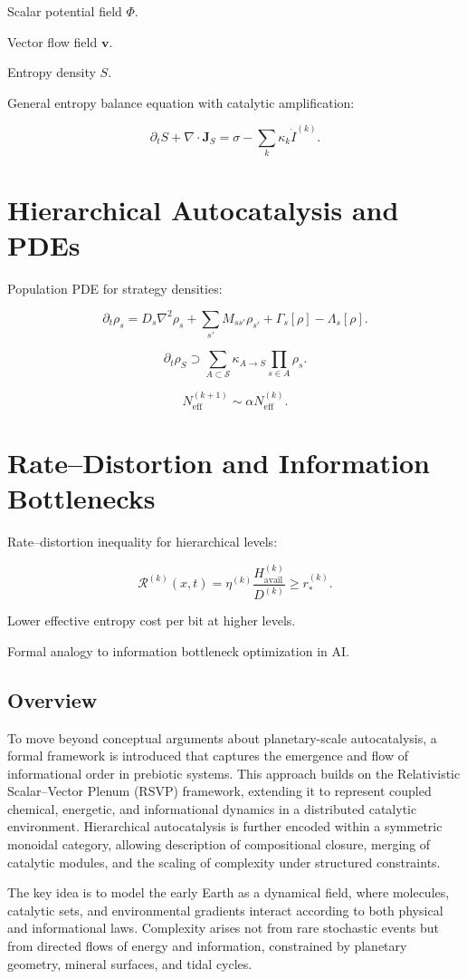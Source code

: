 \documentclass{book}
\begin{document}
Scalar potential field $\Phi$.

Vector flow field $\mathbf{v}$.

Entropy density $S$.

General entropy balance equation with catalytic amplification:

\[\partial_t S + \nabla \cdot \mathbf{J}_S = \sigma - \sum_{k} \kappa_k \dot{I}^{(k)}.\]

\chapter{Hierarchical Autocatalysis and PDEs}
Population PDE for strategy densities:

\[\partial_t \rho_s = D_s \nabla^2 \rho_s + \sum_{s'} M_{s s'} \rho_{s'} + \Gamma_s[\rho] - \Lambda_s[\rho].\]

\[\partial_t \rho_{S} \supset \sum_{A\subset \mathcal{S}} \kappa_{A\to S}\prod_{s\in A}\rho_s.\]

\[N_{\mathrm{eff}}^{(k+1)} \sim \alpha N_{\mathrm{eff}}^{(k)}.\]

\chapter{Rate–Distortion and Information Bottlenecks}
Rate–distortion inequality for hierarchical levels:

\[\mathcal{R}^{(k)}(x,t) = \eta^{(k)} \frac{H^{(k)}_{\mathrm{avail}}}{D^{(k)}} \ge r_\ast^{(k)}.\]

Lower effective entropy cost per bit at higher levels.

Formal analogy to information bottleneck optimization in AI.

\section{Overview}
To move beyond conceptual arguments about planetary-scale autocatalysis, a formal framework is introduced that captures the emergence and flow of informational order in prebiotic systems. This approach builds on the Relativistic Scalar–Vector Plenum (RSVP) framework, extending it to represent coupled chemical, energetic, and informational dynamics in a distributed catalytic environment. Hierarchical autocatalysis is further encoded within a symmetric monoidal category, allowing description of compositional closure, merging of catalytic modules, and the scaling of complexity under structured constraints.

The key idea is to model the early Earth as a dynamical field, where molecules, catalytic sets, and environmental gradients interact according to both physical and informational laws. Complexity arises not from rare stochastic events but from directed flows of energy and information, constrained by planetary geometry, mineral surfaces, and tidal cycles.
\end{document}
